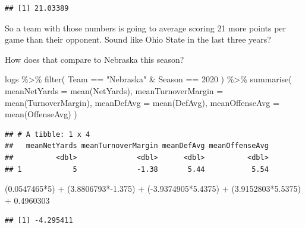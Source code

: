 \documentclass[
]{book}
\newenvironment{Shaded}{\begin{snugshade}}{\end{snugshade}}
\newcommand{\AttributeTok}[1]{\textcolor[rgb]{0.77,0.63,0.00}{#1}}
\newcommand{\DecValTok}[1]{\textcolor[rgb]{0.00,0.00,0.81}{#1}}
\newcommand{\FloatTok}[1]{\textcolor[rgb]{0.00,0.00,0.81}{#1}}
\newcommand{\FunctionTok}[1]{\textcolor[rgb]{0.00,0.00,0.00}{#1}}
\newcommand{\NormalTok}[1]{#1}
\newcommand{\SpecialCharTok}[1]{\textcolor[rgb]{0.00,0.00,0.00}{#1}}
\newcommand{\StringTok}[1]{\textcolor[rgb]{0.31,0.60,0.02}{#1}}
\begin{document}
\begin{verbatim}
## [1] 21.03389
\end{verbatim}

So a team with those numbers is going to average scoring 21 more points per game than their opponent. Sound like Ohio State in the last three years?

How does that compare to Nebraska this season?

\begin{Shaded}
\begin{Highlighting}[]
\NormalTok{logs }\SpecialCharTok{\%\textgreater{}\%} 
  \FunctionTok{filter}\NormalTok{(}
\NormalTok{    Team }\SpecialCharTok{==} \StringTok{"Nebraska"} \SpecialCharTok{\&}\NormalTok{ Season }\SpecialCharTok{==} \DecValTok{2020}
\NormalTok{    ) }\SpecialCharTok{\%\textgreater{}\%} 
  \FunctionTok{summarise}\NormalTok{(}
    \AttributeTok{meanNetYards =} \FunctionTok{mean}\NormalTok{(NetYards),}
    \AttributeTok{meanTurnoverMargin =} \FunctionTok{mean}\NormalTok{(TurnoverMargin),}
    \AttributeTok{meanDefAvg =} \FunctionTok{mean}\NormalTok{(DefAvg),}
    \AttributeTok{meanOffenseAvg =} \FunctionTok{mean}\NormalTok{(OffenseAvg)}
\NormalTok{  )}
\end{Highlighting}
\end{Shaded}

\begin{verbatim}
## # A tibble: 1 x 4
##   meanNetYards meanTurnoverMargin meanDefAvg meanOffenseAvg
##          <dbl>              <dbl>      <dbl>          <dbl>
## 1            5              -1.38       5.44           5.54
\end{verbatim}

\begin{Shaded}
\begin{Highlighting}[]
\NormalTok{(}\FloatTok{0.0547465}\SpecialCharTok{*}\DecValTok{5}\NormalTok{) }\SpecialCharTok{+}\NormalTok{ (}\FloatTok{3.8806793}\SpecialCharTok{*{-}}\FloatTok{1.375}\NormalTok{) }\SpecialCharTok{+}\NormalTok{ (}\SpecialCharTok{{-}}\FloatTok{3.9374905}\SpecialCharTok{*}\FloatTok{5.4375}\NormalTok{) }\SpecialCharTok{+}\NormalTok{ (}\FloatTok{3.9152803}\SpecialCharTok{*}\FloatTok{5.5375}\NormalTok{) }\SpecialCharTok{+} \FloatTok{0.4960303}
\end{Highlighting}
\end{Shaded}

\begin{verbatim}
## [1] -4.295411
\end{verbatim}
\end{document}

